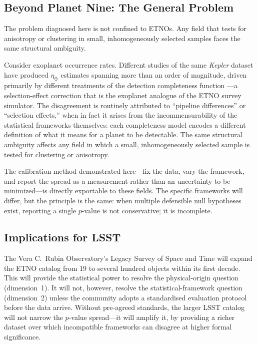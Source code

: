 \documentclass[12pt,a4paper]{article}
\begin{document}
\subsection{Beyond Planet Nine: The General Problem}

The problem diagnosed here is not confined to ETNOs. Any field that tests for anisotropy or clustering in small, inhomogeneously selected samples faces the same structural ambiguity.

Consider exoplanet occurrence rates. Different studies of the same \textit{Kepler} dataset have produced $\eta_\oplus$ estimates spanning more than an order of magnitude, driven primarily by different treatments of the detection completeness function \cite{bryson2025}---a selection-effect correction that is the exoplanet analogue of the ETNO survey simulator. The disagreement is routinely attributed to ``pipeline differences'' or ``selection effects,'' when in fact it arises from the incommensurability of the statistical frameworks themselves: each completeness model encodes a different definition of what it means for a planet to be detectable. The same structural ambiguity affects any field in which a small, inhomogeneously selected sample is tested for clustering or anisotropy.

The calibration method demonstrated here---fix the data, vary the framework, and report the spread as a measurement rather than an uncertainty to be minimized---is directly exportable to these fields. The specific frameworks will differ, but the principle is the same: when multiple defensible null hypotheses exist, reporting a single $p$-value is not conservative; it is incomplete.

\subsection{Implications for LSST}

The Vera C.\ Rubin Observatory's Legacy Survey of Space and Time will expand the ETNO catalog from 19 to several hundred objects within its first decade. This will provide the statistical power to resolve the physical-origin question (dimension~1). It will not, however, resolve the statistical-framework question (dimension~2) unless the community adopts a standardised evaluation protocol before the data arrive. Without pre-agreed standards, the larger LSST catalog will not narrow the $p$-value spread---it will amplify it, by providing a richer dataset over which incompatible frameworks can disagree at higher formal significance.
\end{document}
